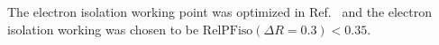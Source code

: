 

The electron isolation working point was optimized in Ref.~\cite{AN-15-277} and the electron isolation working was 
chosen to be $\text{RelPFiso}(\Delta R = 0.3) < 0.35$. 
